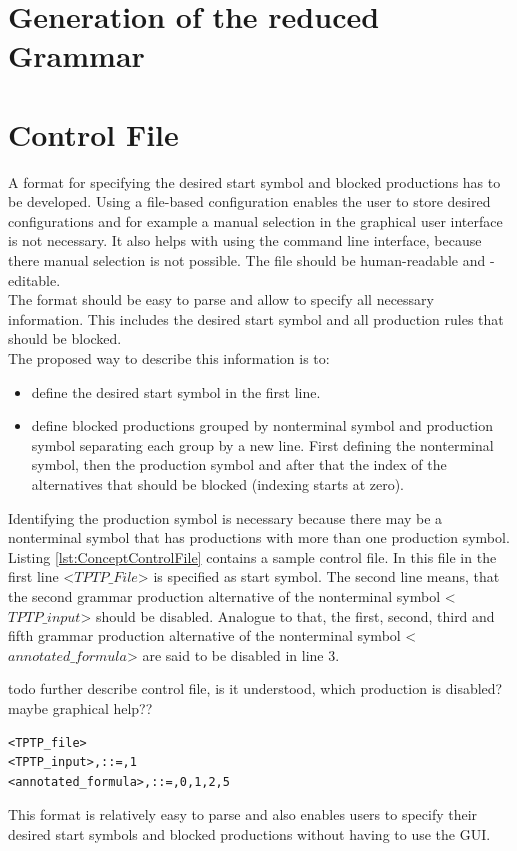 \section{Generation of the reduced Grammar}\label{sec:ConceptGenerateReducedGrammar}

\section{Control File}\label{sec:ConceptControlFile}
A format for specifying the desired start symbol and blocked productions has to be developed.
Using a file-based configuration enables the user to store desired configurations and for example a manual selection in the graphical user interface is not necessary.
It also helps with using the command line interface, because there manual selection is not possible.
The file should be human-readable and -editable.\\
The format should be easy to parse and allow to specify all necessary information.
This includes the desired start symbol and all production rules that should be blocked.\\
The proposed way to describe this information is to:

\begin{itemize}%
	\item define the desired start symbol in the first line.
	\item define blocked productions grouped by nonterminal symbol and production symbol separating each group by a new line.
	First defining the nonterminal symbol, then the production symbol and after that the index of the alternatives that should be blocked (indexing starts at zero). 
\end{itemize}
\label{itemize:ConceptControlFile}
Identifying the production symbol is necessary because there may be a nonterminal symbol that has productions with more than one production symbol.\\
Listing \ref{lst:ConceptControlFile} contains a sample control file. In this file in the first line <$TPTP\_File$> is specified as start symbol.
The second line means, that the second grammar production alternative of the nonterminal symbol <$TPTP\_input$> should be disabled.
Analogue to that, the first, second, third and fifth grammar production alternative of the nonterminal symbol <$annotated\_formula$> are said to be disabled in line 3.

todo further describe control file, is it understood, which production is disabled? maybe graphical help??
\begin{lstlisting}[caption= Example of a control file,label= lst:ConceptControlFile]
<TPTP_file>
<TPTP_input>,::=,1
<annotated_formula>,::=,0,1,2,5
\end{lstlisting}
This format is relatively easy to parse and also enables users to specify their desired start symbols and blocked productions without having to use the  GUI.
